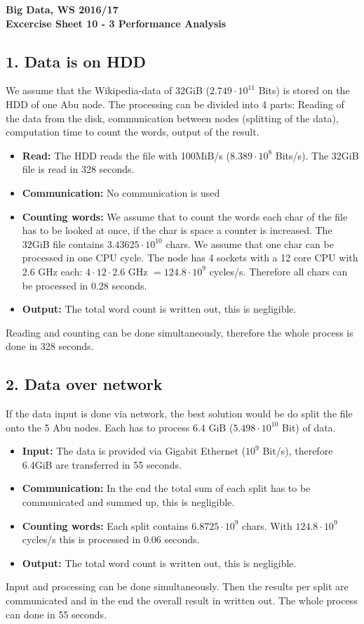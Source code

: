 \documentclass[11pt]{article}
\begin{document}
	
	\begin{center}
		\textbf{
			Big Data, WS 2016/17\\
			Excercise Sheet 10 - 3 Performance Analysis\\
		}
	\end{center}
	\subsection*{1. Data is on HDD}
	We assume that the Wikipedia-data of 32GiB ($2.749\cdot 10^{11}$ Bits) is stored on the HDD of one Abu node.
	The processing can be divided into 4 parts: Reading of the data from the disk, communication between nodes (splitting of the data), computation time to count the words, output of the result. \medskip	
	
	\begin{itemize}
		\item \textbf{Read:} The HDD reads the file with 100MiB/s ($8.389\cdot 10^8$ Bits/s). The 32GiB file is read in 328 seconds.
		\item \textbf{Communication:} No communication is used
		\item  \textbf{Counting words:} We assume that to count the words each char of the file has to be looked at once, if the char is space a counter is increased. The 32GiB file contains $3.43625\cdot 10^{10}$ chars. We assume that one char can be processed in one CPU cycle. The node has 4 sockets with a 12 core CPU with 2.6 GHz each: $4\cdot 12 \cdot 2.6$ GHz $= 124.8\cdot 10^9$ cycles/s.
		Therefore all chars can be processed in 0.28 seconds.
		\item \textbf{Output:} The total word count is written out, this is negligible.
	\end{itemize}
	
	Reading and counting can be done simultaneously, therefore the whole process is done in 328 seconds.
	
	\subsection*{2. Data over network}
	If the data input is done via network, the best solution would be do split the file onto the 5 Abu nodes. Each has to process 6.4 GiB ($5.498\cdot 10^{10}$ Bit) of data. \medskip	
		
		\begin{itemize}
			\item \textbf{Input:} The data is provided via Gigabit Ethernet ($10^9$ Bit/s), therefore 6.4GiB are transferred in 55 seconds.  
			\item \textbf{Communication:} In the end the total sum of each split has to be communicated and summed up, this is negligible.
			\item  \textbf{Counting words:} Each split contains $6.8725\cdot 10^{9}$ chars. With $124.8\cdot 10^9$ cycles/s this is processed in 0.06 seconds.
			\item \textbf{Output:} The total word count is written out, this is negligible.
		\end{itemize}
	Input and processing can be done simultaneously. Then the results per split are communicated and in the end the overall result in written out. 
	The whole process can done in 55 seconds.
\end{document}
